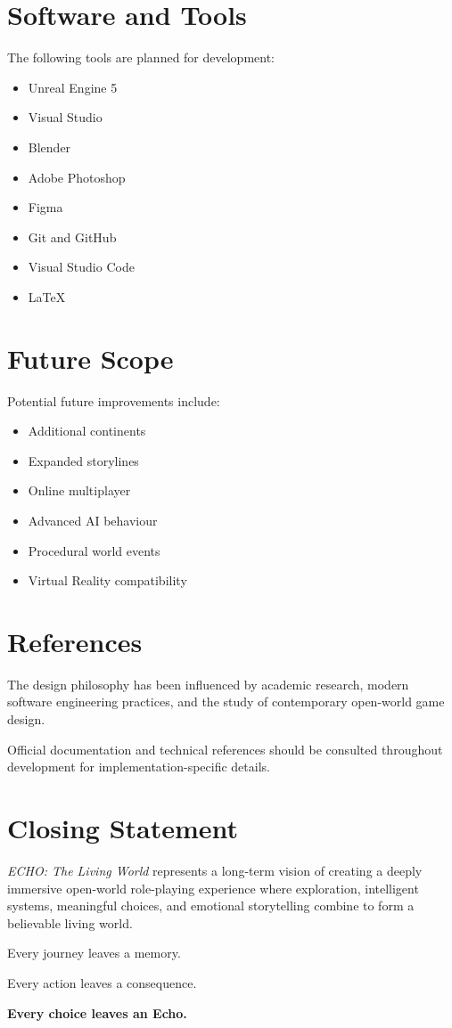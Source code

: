 \section{Software and Tools}

The following tools are planned for development:

\begin{itemize}
    \item Unreal Engine 5
    \item Visual Studio
    \item Blender
    \item Adobe Photoshop
    \item Figma
    \item Git and GitHub
    \item Visual Studio Code
    \item LaTeX
\end{itemize}

\section{Future Scope}

Potential future improvements include:

\begin{itemize}
    \item Additional continents
    \item Expanded storylines
    \item Online multiplayer
    \item Advanced AI behaviour
    \item Procedural world events
    \item Virtual Reality compatibility
\end{itemize}

\section{References}

The design philosophy has been influenced by academic research, modern software engineering practices, and the study of contemporary open-world game design.

Official documentation and technical references should be consulted throughout development for implementation-specific details.

\section{Closing Statement}

\textit{ECHO: The Living World} represents a long-term vision of creating a deeply immersive open-world role-playing experience where exploration, intelligent systems, meaningful choices, and emotional storytelling combine to form a believable living world.

Every journey leaves a memory.

Every action leaves a consequence.

\begin{center}
\textbf{Every choice leaves an Echo.}
\end{center}